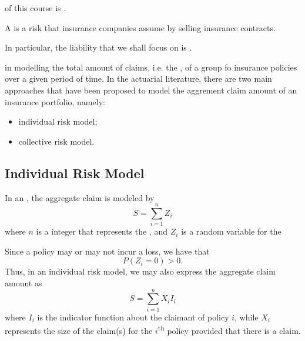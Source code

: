 \documentclass[notoc,notitlepage]{tufte-book}
\begin{document}
 of this course is .

\begin{defn}
\label{defn:liability_risk}
  A  is a risk that insurance companies assume by selling insurance contracts.
\end{defn}

In particular, the liability that we shall focus on is .

 in modelling the total amount of claims, i.e. the , of a group fo insurance policies over a given period of time. In the actuarial literature, there are two main approaches that have been proposed to model the aggrement claim amount of an insurance portfolio, namely:
\begin{itemize}
  \item individual risk model;
  \item collective risk model.
\end{itemize}

\subsection{Individual Risk Model}%
\label{sub:individual_risk_model}

\begin{defn}
\label{defn:individual_risk_model}
  In an , the aggregate claim is modeled by
  \begin{equation*}
    S = \sum_{i=1}^{n} Z_i
  \end{equation*}
  where $n$ is a  integer that represents the , and $Z_i$ is a random variable for the 
\end{defn}

\begin{note}
  Since a policy may or may not incur a loss, we have that
  \begin{equation*}
    P(Z_i = 0) > 0.
  \end{equation*}
  Thus, in an individual risk model, we may also express the aggregate claim amount as
  \begin{equation*}
    S = \sum_{i=1}^{n} X_i I_i
  \end{equation*}
  where $I_i$ is the indicator function about the claimant of policy $i$, while $X_i$ represents the size of the claim(s) for the $i$\textsuperscript{th} policy provided that there is a claim.
\end{note}
\end{document}
